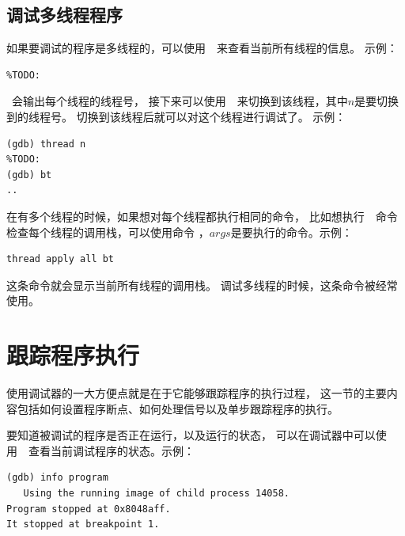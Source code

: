 \subsection{调试多线程程序}
如果要调试的程序是多线程的，可以使用~~来查看当前所有线程的信息。
示例：
\begin{lstlisting}
%TODO:
\end{lstlisting}

~会输出每个线程的线程号，
接下来可以使用~~来切换到该线程，其中$n$是要切换到的线程号。
切换到该线程后就可以对这个线程进行调试了。
示例：
\begin{lstlisting}
(gdb) thread n
%TODO:
(gdb) bt
..
\end{lstlisting}

在有多个线程的时候，如果想对每个线程都执行相同的命令，
比如想执行~~命令检查每个线程的调用栈，可以使用命令
，$args$是要执行的命令。示例：
\begin{lstlisting}
thread apply all bt
\end{lstlisting}
这条命令就会显示当前所有线程的调用栈。
调试多线程的时候，这条命令被经常使用。

\section{跟踪程序执行}
使用调试器的一大方便点就是在于它能够跟踪程序的执行过程，
这一节的主要内容包括如何设置程序断点、如何处理信号以及单步跟踪程序的执行。

要知道被调试的程序是否正在运行，以及运行的状态，
可以在调试器中可以使用~~查看当前调试程序的状态。示例：
\begin{lstlisting}
(gdb) info program
   Using the running image of child process 14058.
Program stopped at 0x8048aff.
It stopped at breakpoint 1.
\end{lstlisting}

